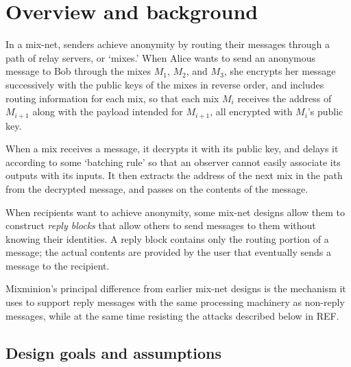 \documentclass[11pt]{IEEEtran}
\begin{document}
\section{Overview and background}
%
In a mix-net, senders achieve anonymity by routing their
messages through a path of relay servers, or `mixes.'  When Alice
wants to send an anonymous message to Bob through the mixes $M_1$,
$M_2$, and $M_3$, she encrypts her message successively with the
public keys of the mixes in reverse order, and includes routing
information for each mix, so that each mix $M_i$ receives the address
of $M_{i+1}$ along with the payload intended for $M_{i+1}$, all
encrypted with $M_i$'s public key.  
% 

When a mix receives a message, it decrypts it with its public key, 
and delays it according to some `batching rule' so that an observer
cannot easily associate its outputs with its inputs.  It then
extracts the address of the next mix in the path from the
decrypted message, and passes on the contents of the message.


When recipients want to achieve anonymity, some mix-net designs allow
them to construct \emph{reply blocks} that allow others to send
messages to them without knowing their identities.  A reply block
contains only the routing portion of a message; the actual contents
are provided by the user that eventually sends a message to the
recipient.

Mixminion's principal difference from earlier mix-net designs is the
mechanism it uses to support reply messages with the same processing
machinery as non-reply messages, while at the same time resisting the
attacks described below in REF.

\subsection{Design goals and assumptions}
\end{document}
